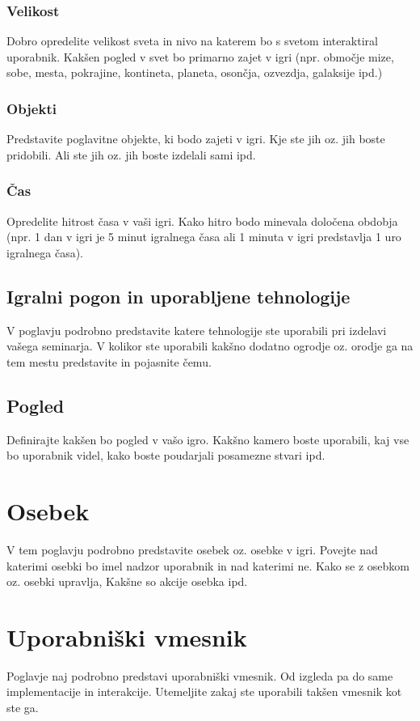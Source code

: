 \documentclass[a4paper]{article}
\begin{document}
\subsubsection{Velikost}
Dobro opredelite velikost sveta in nivo na katerem bo s svetom interaktiral uporabnik. Kakšen pogled v svet bo primarno zajet v igri (npr. območje mize, sobe, mesta, pokrajine, kontineta, planeta, osončja, ozvezdja, galaksije ipd.)

\subsubsection{Objekti}
Predstavite poglavitne objekte, ki bodo zajeti v igri. Kje ste jih oz. jih boste pridobili. Ali ste jih oz. jih boste izdelali sami ipd.

\subsubsection{Čas}
Opredelite hitrost časa v vaši igri. Kako hitro bodo minevala določena obdobja (npr. 1 dan v igri je 5 minut igralnega časa ali 1 minuta v igri predstavlja 1 uro igralnega časa).

\subsection{Igralni pogon in uporabljene tehnologije}
V poglavju podrobno predstavite katere tehnologije ste uporabili pri izdelavi vašega seminarja. V kolikor ste uporabili kakšno dodatno ogrodje oz. orodje ga na tem mestu predstavite in pojasnite čemu.

\subsection{Pogled}
Definirajte kakšen bo pogled v vašo igro. Kakšno kamero boste uporabili, kaj vse bo uporabnik videl, kako boste poudarjali posamezne stvari ipd.

\section{Osebek}
V tem poglavju podrobno predstavite osebek oz. osebke v igri. Povejte nad katerimi osebki bo imel nadzor uporabnik in nad katerimi ne. Kako se z osebkom oz. osebki upravlja, Kakšne so akcije osebka ipd.

\section{Uporabniški vmesnik}
Poglavje naj podrobno predstavi uporabniški vmesnik. Od izgleda pa do same implementacije in interakcije. Utemeljite zakaj ste uporabili takšen vmesnik kot ste ga.
\end{document}
